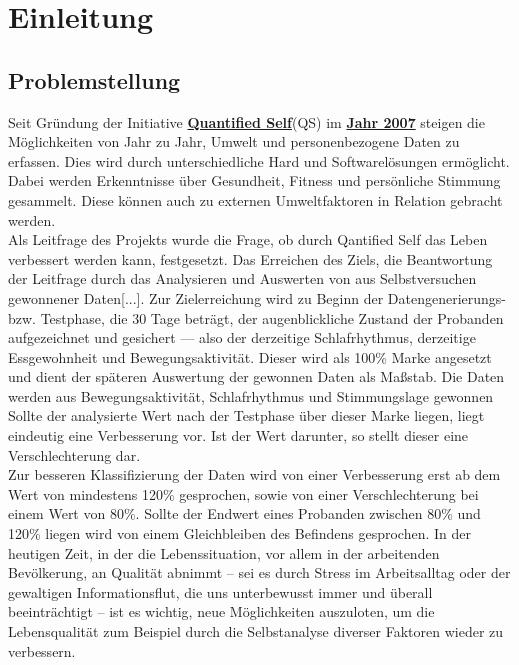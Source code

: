 
\chapter{Einleitung}
\label{ch:Einleitung}

\section{Problemstellung}
\label{ch:Einleitung:sec:Problemstellung}

Seit Gründung der Initiative \href{http://quantifiedself.com/}{\textbf{Quantified Self}}(QS) im \href{http://quantifiedself.com/2011/03/what-is-the-quantified-self/}{\textbf{Jahr 2007}} steigen die Möglichkeiten von Jahr zu Jahr, Umwelt und personenbezogene Daten zu erfassen. 
Dies wird durch unterschiedliche Hard und Softwarelösungen ermöglicht. \\
Dabei werden Erkenntnisse über Gesundheit, Fitness und persönliche Stimmung gesammelt.
Diese können auch zu externen Umweltfaktoren in Relation gebracht werden. \\
Als Leitfrage des Projekts wurde die Frage, ob durch Qantified Self das Leben verbessert werden kann, festgesetzt. 
Das Erreichen des Ziels, die Beantwortung der Leitfrage durch das Analysieren und Auswerten von aus Selbstversuchen gewonnener Daten[...].
Zur Zielerreichung wird zu Beginn der Datengenerierungs- bzw. Testphase, die 30 Tage beträgt, der augenblickliche Zustand der Probanden aufgezeichnet und gesichert –– also der derzeitige Schlafrhythmus, derzeitige Essgewohnheit und Bewegungsaktivität. %
Dieser wird als 100\% Marke angesetzt und dient der späteren Auswertung der gewonnen Daten als Maßstab. 
Die Daten werden aus Bewegungsaktivität, Schlafrhythmus und Stimmungslage gewonnen 
Sollte der analysierte Wert nach der Testphase über dieser Marke liegen, liegt eindeutig eine Verbesserung vor. 
Ist der Wert darunter, so stellt dieser eine Verschlechterung dar. \\
Zur besseren Klassifizierung der Daten wird von einer Verbesserung erst ab dem Wert von mindestens 120\% gesprochen, sowie von einer Verschlechterung bei einem Wert von 80\%. Sollte der Endwert eines Probanden zwischen 80\% und 120\% liegen wird von einem Gleichbleiben des Befindens gesprochen.
In der heutigen Zeit, in der die Lebenssituation, vor allem in der arbeitenden Bevölkerung, an Qualität abnimmt – sei es durch Stress im Arbeitsalltag oder der gewaltigen Informationsflut, die uns unterbewusst immer und überall beeinträchtigt – ist es wichtig, neue Möglichkeiten auszuloten, um die Lebensqualität zum Beispiel durch die Selbstanalyse diverser Faktoren wieder zu verbessern. 


